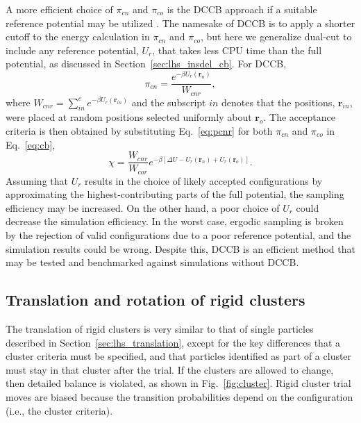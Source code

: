 A more efficient choice of $\pi_{cn}$ and $\pi_{co}$ is the DCCB approach if a suitable reference potential may be utilized \cite{vlugt_improving_1998}.
The namesake of DCCB is to apply a shorter cutoff to the energy calculation in $\pi_{cn}$ and $\pi_{co}$, but here we generalize dual-cut to include any reference potential, $U_r$, that takes less CPU time than the full potential, as discussed in Section~\ref{sec:lhs_insdel_cb}.
For DCCB,
\begin{equation}
\pi_{cn}=\frac{e^{-\beta U_r(\mathbf{r}_n)}}{W_{cnr}},
\label{eq:pcnr}
\end{equation}
where $W_{cnr}=\sum_{in}^c e^{-\beta U_r(\mathbf{r}_{in})}$ and the subscript $in$ denotes that the positions, $\mathbf{r}_{in}$, were placed at random positions selected uniformly about $\mathbf{r}_o$.
The acceptance criteria is then obtained by substituting Eq.~\ref{eq:pcnr} for both $\pi_{cn}$ and $\pi_{co}$ in Eq.~\ref{eq:cb},
\begin{equation}
\chi = \frac{W_{cnr}}{W_{cor}}e^{-\beta [\Delta U - U_r(\mathbf{r}_n) + U_r(\mathbf{r}_o)]}.
\end{equation}
Assuming that $U_r$ results in the choice of likely accepted configurations by approximating the highest-contributing parts of the full potential, the sampling efficiency may be increased.
On the other hand, a poor choice of $U_r$ could decrease the simulation efficiency.
In the worst case, ergodic sampling is broken by the rejection of valid configurations due to a poor reference potential, and the simulation results could be wrong.
Despite this, DCCB is an efficient method that may be tested and benchmarked against simulations without DCCB.

\subsection{\label{sec:lhs_cluster}Translation and rotation of rigid clusters}

The translation of rigid clusters is very similar to that of single particles described in Section~\ref{sec:lhs_translation}, except for the key differences that a cluster criteria must be specified, and that particles identified as part of a cluster must stay in that cluster after the trial.
If the clusters are allowed to change, then detailed balance is violated, as shown in Fig.~\ref{fig:cluster}.
Rigid cluster trial moves are biased because the transition probabilities depend on the configuration (i.e., the cluster criteria).

